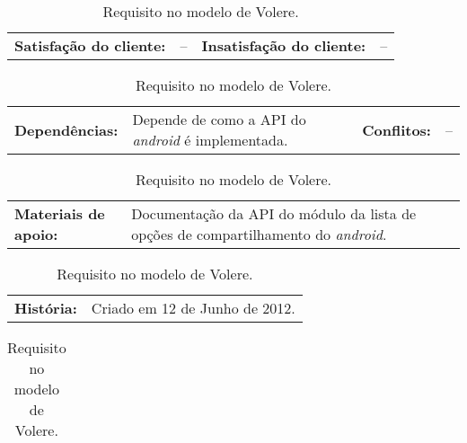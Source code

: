 \begin{table}[h]
    \vspace{5pt}
    \begin{tabularx}{\textwidth}{p{}p{}
                                 p{}p{}}
        \textbf{Satisfação do cliente:} & -- & 
        \textbf{Insatisfação do cliente:} & --
    \end{tabularx}
    
    \vspace{5pt}
    \begin{tabularx}{\textwidth}{p{}p{}
                                 p{}p{}}
        \textbf{Dependências:} & Depende de como a API do \emph{android}
        é implementada.
        & \textbf{Conflitos:} & -- \\
    \end{tabularx}
    
    \vspace{5pt}
    \begin{tabularx}{\textwidth}{p{} p{}}
        \textbf{Materiais de apoio:} &
       Documentação da API do módulo da lista de opções de 
       compartilhamento do \emph{android}.
    \end{tabularx}
    
    \vspace{5pt}
    \begin{tabularx}{\textwidth}{p{} p{}}
        \textbf{História:} &
        Criado em 12 de Junho de 2012. \\
    \end{tabularx}
    
    \begin{tabularx}{\textwidth}{c}
        \bottomrule
    \end{tabularx}
    
    \caption{ \label{Volere2} Requisito no modelo de Volere. }
\end{table}
